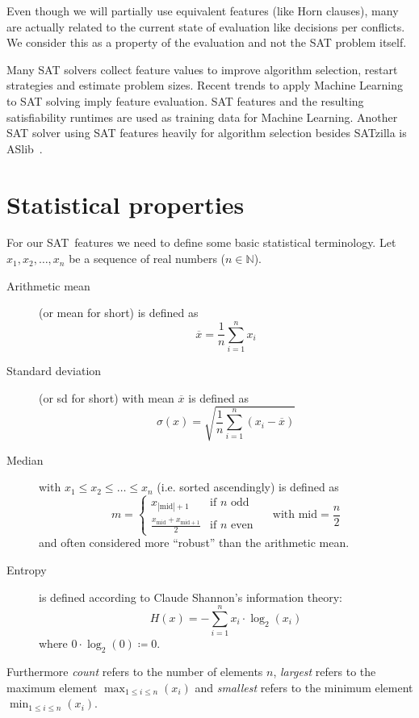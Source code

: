 Even though we will partially use equivalent features (like Horn clauses),
many are actually related to the current state of evaluation like decisions
per conflicts. We consider this as a property of the evaluation and not the
SAT problem itself.

Many SAT solvers collect feature values to improve algorithm selection,
restart strategies and estimate problem sizes. Recent trends to apply Machine
Learning to SAT solving imply feature evaluation. SAT features and the resulting
satisfiability runtimes are used as training data for Machine Learning.
Another SAT solver using SAT features heavily for algorithm selection
besides SATzilla is ASlib~\cite{aslib}.

\section{Statistical properties}
\label{sec:features-stats}
%
For our SAT~features we need to define some basic statistical terminology.
Let $x_1, x_2, \ldots, x_n$ be a sequence of real numbers ($n \in \mathbb N$).
\begin{description}
  \item[Arithmetic mean] (or mean for short)
    is defined as
    \[ \overline{x} = \frac1n \sum_{i=1}^n x_i \]
  \item[Standard deviation] (or sd for short)
    with mean $\overline{x}$ is defined as
    \[ \sigma(x) = \sqrt{\frac1n \sum_{i=1}^n (x_i - \overline{x})} \]
  \item[Median]
    with $x_1 \leq x_2 \leq \ldots \leq x_n$
    (i.e. sorted ascendingly) is defined as
    \[
       m = \begin{cases}
         x_{|\text{mid}|+1} & \text{if } n \text{ odd} \\
         \frac{x_{\text{mid}} + x_{\text{mid} + 1}}{2} & \text{if } n \text{ even}
       \end{cases}
       \quad\text{ with } \text{mid} = \frac{n}{2}
    \]
    and often considered more \enquote{robust} than the arithmetic mean.
  \item[Entropy]
    is defined according to Claude Shannon's information theory:
    \[ H(x) = -\sum_{i=1}^n x_i \cdot \log_2(x_i) \]
    where $0 \cdot \log_2(0) \coloneqq 0$.
\end{description}

Furthermore \emph{count} refers to the number of elements $n$,
\emph{largest} refers to the maximum element $\max_{1 \leq i \leq n}(x_i)$
and \emph{smallest} refers to the minimum element $\min_{1 \leq i \leq n}(x_i)$.


